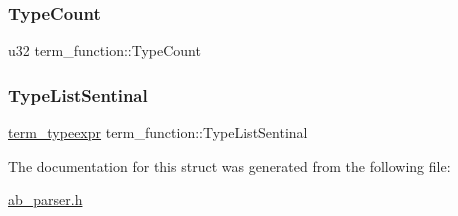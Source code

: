 \mbox{\label{structterm__function_a4e47cbfb96047c0ed4e06e87e079fb6a}} 
\subsubsection{\texorpdfstring{Type\+Count}{TypeCount}}
{\footnotesize\ttfamily u32 term\+\_\+function\+::\+Type\+Count}

\mbox{\label{structterm__function_a96b877553f990184a9da245207de9524}} 
\subsubsection{\texorpdfstring{Type\+List\+Sentinal}{TypeListSentinal}}
{\footnotesize\ttfamily \hyperlink{structterm__typeexpr}{term\+\_\+typeexpr} term\+\_\+function\+::\+Type\+List\+Sentinal}



The documentation for this struct was generated from the following file\+:\begin{DoxyCompactItemize}
\item 
\hyperlink{ab__parser_8h}{ab\+\_\+parser.\+h}\end{DoxyCompactItemize}
